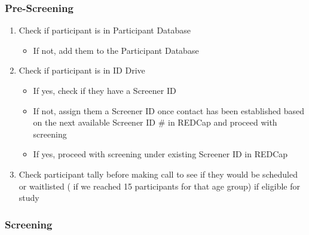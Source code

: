 \documentclass[]{book}
\providecommand{\tightlist}{%
  \setlength{\itemsep}{0pt}\setlength{\parskip}{0pt}}
\begin{document}
\hypertarget{pre-screening-1}{%
\subsubsection{Pre-Screening}\label{pre-screening-1}}

\begin{enumerate}
\def\labelenumi{\arabic{enumi}.}
\tightlist
\item
  Check if participant is in Participant Database

  \begin{itemize}
  \tightlist
  \item
    If not, add them to the Participant Database
  \end{itemize}
\item
  Check if participant is in ID Drive

  \begin{itemize}
  \tightlist
  \item
    If yes, check if they have a Screener ID
  \item
    If not, assign them a Screener ID once contact has been established based on the next available Screener ID \# in REDCap and proceed with screening
  \item
    If yes, proceed with screening under existing Screener ID in REDCap
  \end{itemize}
\item
  Check participant tally before making call to see if they would be scheduled or waitlisted ( if we reached 15 participants for that age group) if eligible for study
\end{enumerate}

\hypertarget{screening-1}{%
\subsubsection{Screening}\label{screening-1}}
\end{document}
